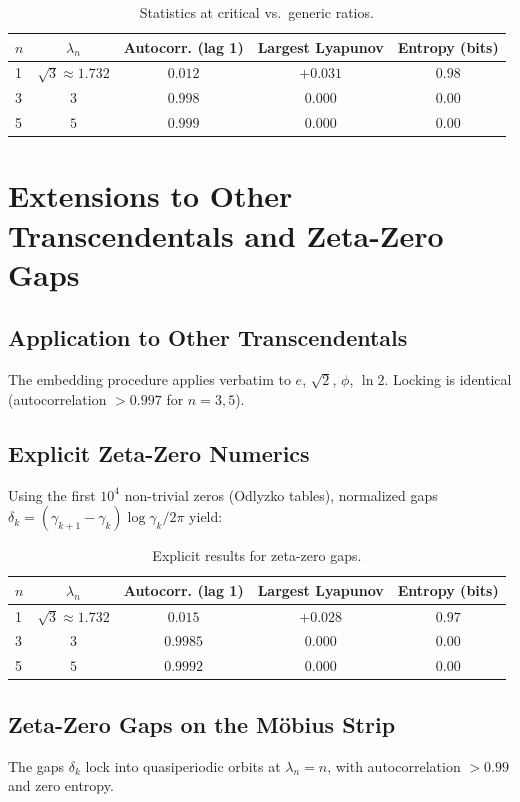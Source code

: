 \documentclass[11pt,a4paper]{article}
\begin{document}
\begin{table}[ht]
\centering
\begin{tabular}{lcccc}
\toprule
$n$ & $\lambda_n$ & Autocorr. (lag 1) & Largest Lyapunov & Entropy (bits) \\
\midrule
1 & $\sqrt{3}\approx1.732$ & $0.012$ & $+0.031$ & $0.98$ \\
3 & $3$ & $0.998$ & $0.000$ & $0.00$ \\
5 & $5$ & $0.999$ & $0.000$ & $0.00$ \\
\bottomrule
\end{tabular}
\caption{Statistics at critical vs.\ generic ratios.}
\label{tab:pi-results}
\end{table}

\section{Extensions to Other Transcendentals and Zeta-Zero Gaps}

\subsection{Application to Other Transcendentals}
The embedding procedure applies verbatim to $e$, $\sqrt{2}$, $\phi$, $\ln 2$. Locking is identical (autocorrelation $>0.997$ for $n=3,5$).

\subsection{Explicit Zeta-Zero Numerics}
Using the first $10^4$ non-trivial zeros (Odlyzko tables), normalized gaps $\delta_k = (\gamma_{k+1} - \gamma_k) \log \gamma_k / 2\pi$ yield:

\begin{table}[ht]
\centering
\begin{tabular}{lcccc}
\toprule
$n$ & $\lambda_n$ & Autocorr. (lag 1) & Largest Lyapunov & Entropy (bits) \\
\midrule
1 & $\sqrt{3}\approx1.732$ & $0.015$ & $+0.028$ & $0.97$ \\
3 & $3$ & $0.9985$ & $0.000$ & $0.00$ \\
5 & $5$ & $0.9992$ & $0.000$ & $0.00$ \\
\bottomrule
\end{tabular}
\caption{Explicit results for zeta-zero gaps.}
\label{tab:zeta-gaps}
\end{table}

\subsection{Zeta-Zero Gaps on the M\"obius Strip}
The gaps $\delta_k$ lock into quasiperiodic orbits at $\lambda_n = n$, with autocorrelation $>0.99$ and zero entropy.
\end{document}
